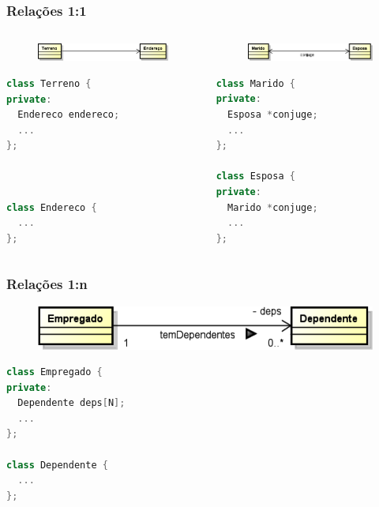 \documentclass[aspectratio=169]{beamer}
\begin{document}
\begin{frame}[fragile]\frametitle{Relações 1:1}
\begin{columns}
\begin{column}{0.5\linewidth}
	\begin{figure}[h]
		\includegraphics[height=0.1\paperheight]{imagens/associacao3.png}
	\end{figure}
\begin{lstlisting}[language=C++]
class Terreno {
private:
  Endereco endereco;
  ...
};



class Endereco {
  ...
};
\end{lstlisting}

\end{column}
\begin{column}{0.5\linewidth}
	\begin{figure}[h]
		\includegraphics[height=0.1\paperheight]{imagens/associacao4.png}
	\end{figure}

\begin{lstlisting}[language=C++]
class Marido {
private:
  Esposa *conjuge;
  ...
};

class Esposa {
private:
  Marido *conjuge;
  ...
};
\end{lstlisting}
\end{column}
\end{columns}
\end{frame}

\begin{frame}[fragile]\frametitle{Relações 1:n}
\begin{figure}[h]
	\includegraphics[height=0.1\paperheight]{imagens/associacao5.png}
\end{figure}
\begin{lstlisting}[language=C++]
class Empregado {
private:
  Dependente deps[N];
  ...
};

class Dependente {
  ...
};
\end{lstlisting}
\end{frame}
\end{document}
